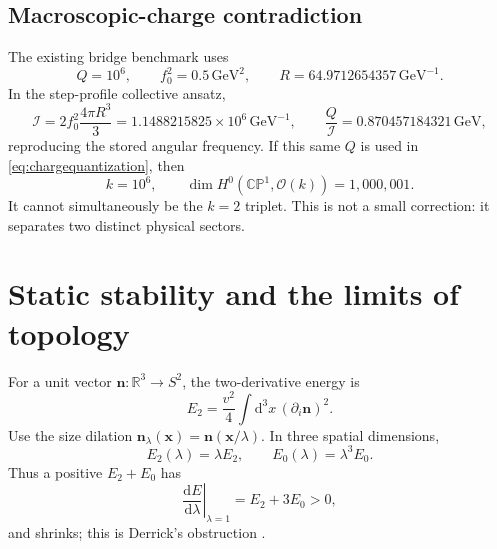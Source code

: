 \documentclass[11pt]{article}
\numberwithin{equation}{section}
\newcommand{\CP}{\mathbb{CP}}
\newcommand{\RR}{\mathbb R}
\newcommand{\cO}{\mathcal O}
\newcommand{\cI}{\mathcal I}
\newcommand{\dd}{\mathrm d}
\begin{document}
\subsection{Macroscopic-charge contradiction}

The existing bridge benchmark uses
\begin{equation}
 Q=10^6,\qquad f_0^2=0.5\,\mathrm{GeV}^2,\qquad
 R=64.9712654357\,\mathrm{GeV}^{-1}.
\end{equation}
In the step-profile collective ansatz,
\begin{equation}
 \cI=2f_0^2\frac{4\pi R^3}{3}
 =1.1488215825\times10^6\,\mathrm{GeV}^{-1},
 \qquad
 \frac{Q}{\cI}=0.870457184321\,\mathrm{GeV},
 \label{eq:benchmarkinertia}
\end{equation}
reproducing the stored angular frequency.  If this same \(Q\) is used in
\eqref{eq:chargequantization}, then
\begin{equation}
 k=10^6,
 \qquad
 \dim H^0(\CP^1,\cO(k))=1{,}000{,}001.
 \label{eq:macrocontradiction}
\end{equation}
It cannot simultaneously be the \(k=2\) triplet.  This is not a small
correction: it separates two distinct physical sectors.

\section{Static stability and the limits of topology}

For a unit vector \(\bm n:\RR^3\to S^2\), the two-derivative energy is
\begin{equation}
 E_2=\frac{v^2}{4}\int\dd^3x\,(\partial_i\bm n)^2.
 \label{eq:E2}
\end{equation}
Use the size dilation \(\bm n_\lambda(\bm x)=\bm n(\bm x/\lambda)\).  In three
spatial dimensions,
\begin{equation}
 E_2(\lambda)=\lambda E_2,
 \qquad E_0(\lambda)=\lambda^3E_0.
 \label{eq:derricktwo}
\end{equation}
Thus a positive \(E_2+E_0\) has
\begin{equation}
 \left.\frac{\dd E}{\dd\lambda}\right|_{\lambda=1}
 =E_2+3E_0>0,
 \label{eq:derrickslope}
\end{equation}
and shrinks; this is Derrick's obstruction \cite{Derrick1964}.
\end{document}
